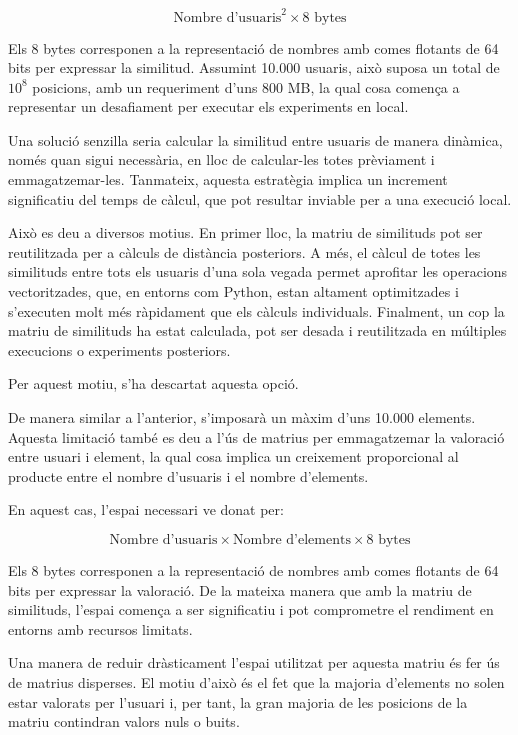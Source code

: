 \documentclass[a4paper,12pt]{report}
\begin{document}
\[
\text{Nombre d’usuaris}^2 \times 8 \text{ bytes}
\]

Els 8 bytes corresponen a la representació de nombres amb comes flotants de 64 bits per expressar la similitud.
Assumint 10.000 usuaris, això suposa un total de $10^8$ posicions, amb un requeriment d’uns 800 MB, la qual cosa comença a representar un desafiament per executar els experiments en local.

Una solució senzilla seria calcular la similitud entre usuaris de manera dinàmica, només quan sigui necessària, en lloc de calcular-les totes prèviament i emmagatzemar-les.
Tanmateix, aquesta estratègia implica un increment significatiu del temps de càlcul, que pot resultar inviable per a una execució local.

Això es deu a diversos motius. En primer lloc, la matriu de similituds pot ser reutilitzada per a càlculs de distància posteriors. A més, el càlcul de totes les similituds entre tots els usuaris d’una sola vegada permet aprofitar les operacions vectoritzades, que, en entorns com Python, estan altament optimitzades i s’executen molt més ràpidament que els càlculs individuals. Finalment, un cop la matriu de similituds ha estat calculada, pot ser desada i reutilitzada en múltiples execucions o experiments posteriors.

Per aquest motiu, s’ha descartat aquesta opció.

De manera similar a l’anterior, s’imposarà un màxim d’uns 10.000 elements.
Aquesta limitació també es deu a l’ús de matrius per emmagatzemar la valoració entre usuari i element, la qual cosa implica un creixement proporcional al producte entre el nombre d’usuaris i el nombre d’elements.

En aquest cas, l’espai necessari ve donat per:

\[
\text{Nombre d’usuaris} \times \text{Nombre d’elements} \times 8 \text{ bytes}
\]

Els 8 bytes corresponen a la representació de nombres amb comes flotants de 64 bits per expressar la valoració.
De la mateixa manera que amb la matriu de similituds, l’espai comença a ser significatiu i pot comprometre el rendiment en entorns amb recursos limitats.

Una manera de reduir dràsticament l'espai utilitzat per aquesta matriu és fer ús de matrius disperses.
El motiu d’això és el fet que la majoria d’elements no solen estar valorats per l’usuari i, per tant, la gran majoria de les posicions de la matriu contindran valors nuls o buits.
\end{document}
